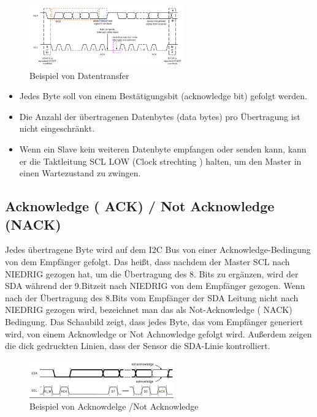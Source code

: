 \documentclass[conference]{IEEEtran}
\begin{document}
\begin{figure}[h]
	\centering
	\includegraphics[width=0.7\linewidth]{fig7}
	\caption{Beispiel von Datentransfer}
	\label{fig:fig7}
\end{figure}

\begin{itemize}
	\item Jedes Byte soll von einem Bestätigungsbit (acknowledge bit) gefolgt werden.
		\item 	Die Anzahl der übertragenen Datenbytes (data bytes) pro Übertragung ist nicht eingeschränkt. 
		\item 	Wenn ein Slave kein weiteren Datenbyte empfangen oder senden kann, kann er die Taktleitung SCL LOW (Clock strechting ) halten, um den Master in einen Wartezustand zu zwingen. 
\end{itemize}

\subsection{Acknowledge ( ACK) / Not Acknowledge  (NACK)}
Jedes übertragene Byte wird auf dem I2C Bus von einer Acknowledge-Bedingung  von dem Empfänger gefolgt. Das heißt, dass nachdem der Master SCL nach NIEDRIG gezogen hat, um die Übertragung des 8. Bits zu ergänzen, wird der SDA während der 9.Bitzeit nach NIEDRIG von dem Empfänger gezogen. Wenn nach der Übertragung des 8.Bits vom Empfänger der SDA Leitung nicht nach NIEDRIG  gezogen wird, bezeichnet man das als Not-Acknowledge ( NACK) Bedingung.
Das Schaubild zeigt, dass jedes Byte, das vom Empfänger generiert wird, von einem Acknowledge or Not Achnowledge gefolgt wird. Außerdem zeigen die dick gedruckten Linien, dass der Sensor die SDA-Linie kontrolliert.   

\begin{figure}[h]
	\centering
	\includegraphics[width=0.7\linewidth]{fig8}
	\caption{Beispiel von  Acknowdelge /Not Acknowledge}
	\label{fig:fig8}
\end{figure}
\end{document}
